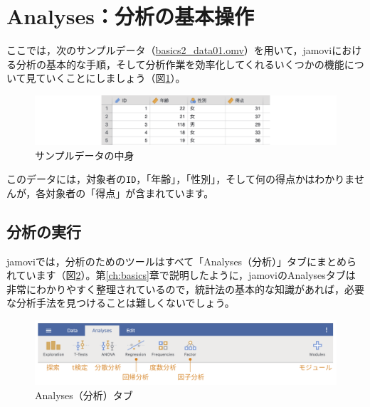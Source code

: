 \documentclass[
  12pt,
  a5jpaper,
  lualatex, ja=standard]{bxjsbook}
\begin{document}
\hypertarget{sec:analysis-basic}{%
\section{Analyses：分析の基本操作}\label{sec:analysis-basic}}

ここでは，次のサンプルデータ（\href{https://github.com/sbtseiji/jmv_compguide/raw/main/data/omv/basics2_data01.omv}{basics2\_data01.omv}）を用いて，jamoviにおける分析の基本的な手順，そして分析作業を効率化してくれるいくつかの機能について見ていくことにしましょう（図\ref{fig:bs2-data01}）。

\begin{figure}[!ht]

{\centering \includegraphics[width=1\linewidth]{images/basics2/data01} 

}

\caption{サンプルデータの中身}\label{fig:bs2-data01}
\end{figure}

このデータには，対象者の\texttt{ID}，「年齢」，「性別」，そして何の得点かはわかりませんが，各対象者の「得点」が含まれています。

\hypertarget{subsec:basic2-execute-analysis}{%
\subsection{分析の実行}\label{subsec:basic2-execute-analysis}}

jamoviでは，分析のためのツールはすべて「Analyses（分析）」タブにまとめられています（図\ref{fig:bs2-analyses-tab}）。第\ref{ch:basics}章で説明したように，jamoviのAnalysesタブは非常にわかりやすく整理されているので，統計法の基本的な知識があれば，必要な分析手法を見つけることは難しくないでしょう。

\begin{figure}[!ht]

{\centering \includegraphics[width=1\linewidth]{images/basics2/analyses-tab} 

}

\caption{Analyses（分析）タブ}\label{fig:bs2-analyses-tab}
\end{figure}
\end{document}
